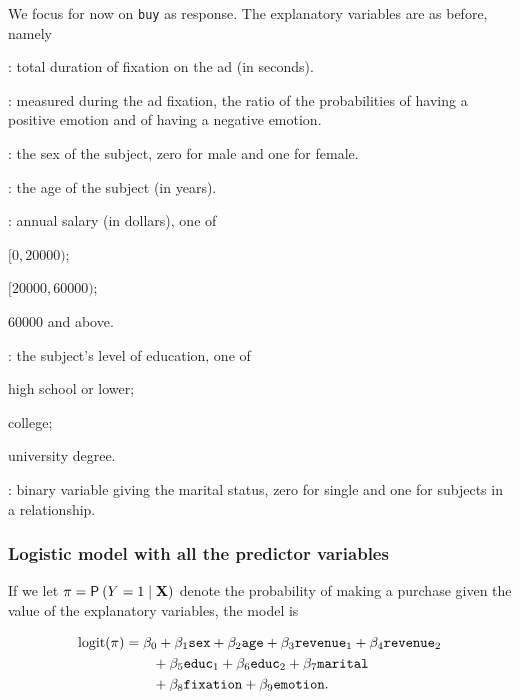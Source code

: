 \documentclass{beamer}
\begin{document}
\begin{frame}[fragile]

We focus for now on \texttt{buy} as response. The explanatory variables are as before, namely
 {\small 
\bi
\item {}: total duration of fixation on the ad (in seconds).
\item {}: measured during the ad fixation, the ratio of the probabilities of having a positive emotion and  of having a negative emotion.
\item {}: the sex of the subject, zero for male and one for female.
\item {}: the age of the subject (in years).
\item {}: annual salary (in dollars), one of 
{ \footnotesize
\be 
\item $[0, 20 000);$
\item $[20 000, 60 000)$; 
\item $60 000$ and above.
\ee
}
\item {}: the subject's level of education, one of 
{ \footnotesize
\be 
\item high school or lower;
\item college; 
\item university degree.
\ee
}
\item {}: binary variable giving the marital status, zero for single and one for subjects in a relationship.
\ei
}
\end{frame}
\begin{frame}[fragile]
\frametitle{Logistic model with all the predictor variables}
If we let $\pi=\P{Y=1\mid \mathbf{X}}$ denote the probability of making a purchase given the value of the explanatory variables, the model is

\begin{align*}
\logit(\pi)&=\beta_0 + \beta_1 \code{sex} + \beta_2 \code{age} + \beta_3 \code{revenue}_1 + \beta_4 \code{revenue}_2 \\
&\qquad + \beta_5 \code{educ}_1 + \beta_6 \code{educ}_2 + \beta_7 \code{marital} \\
&\qquad + \beta_8 \code{fixation} + \beta_9 \code{emotion}.
\end{align*}



\end{frame}
\end{document}
